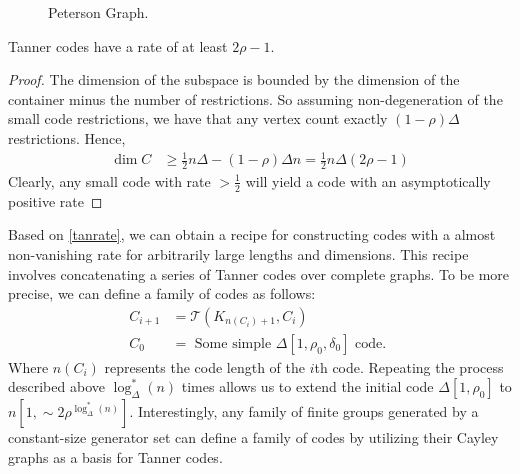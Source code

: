 \begin{center}
  \begin{figure}[H]
  \caption{Peterson Graph.} 
  \label{fig:pet}
\end{figure}
\end{center}
  \begin{lemma}
\label{tanrate} Tanner codes have a rate of at least $2\rho - 1$.
\end{lemma}
  \begin{proof}  The dimension of the subspace is bounded by the dimension of the container minus the number of restrictions. So assuming non-degeneration of the small code restrictions, we have that any vertex count exactly $ \left( 1 - \rho  \right)\Delta $ restrictions. Hence, \begin{equation*}
    \begin{split}
      \dim C & \ge \frac{1}{2}n\Delta - \left( 1-\rho \right)\Delta n = \frac{1}{2}n\Delta\left( 2\rho - 1 \right)  
    \end{split}
  \end{equation*} Clearly, any small code with rate $> \frac{1}{2}$ will yield a code with an asymptotically positive rate \end{proof} 
  Based on \cref{tanrate}, we can obtain a recipe for constructing codes with a almost non-vanishing rate for arbitrarily large lengths and dimensions. This recipe involves concatenating a series of Tanner codes over complete graphs. To be more precise, we can define a family of codes as follows:
  \begin{equation*}
    \begin{split}
      C_{i+1} & = \mathcal{T}\left( K_{n(C_{i}) + 1}, C_{i} \right) \\
      C_{0} &= \text{ Some simple } \Delta[1, \rho_{0}, \delta_{0}] \text{ code. }
    \end{split}
  \end{equation*}
Where $n(C_i)$ represents the code length of the $i$th code. Repeating the process described above $\log_{\Delta}^{*}(n)$ times allows us to extend the initial code $\Delta[1,\rho_{0}]$ to $n[1, \sim 2\rho^{\log_{\Delta}^{*}(n)}]$. Interestingly, any family of finite groups generated by a constant-size generator set can define a family of codes by utilizing their Cayley graphs as a basis for Tanner codes.

